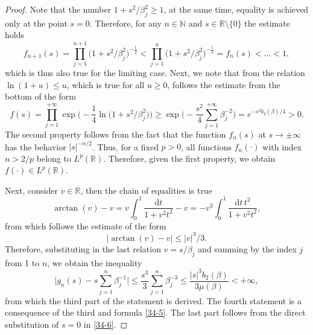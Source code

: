 \documentclass[a4paper]{article}
\begin{document}
\begin{proof} Note that the number $1+s^2/\beta_j^2\geqslant1$, at the same time, equality is achieved only at the point $s=0$. Therefore, for any $n\in\mathbb{N}$ and $s\in\mathbb{R}\setminus\{0\}$ the estimate holds
\begin{equation}\label{34-11}
f_{n+1}(s)=\prod_{j=1}^{n+1}\Big(1+s^2/\beta_j^2\Big)^{-\frac{1}{4}}<
\prod_{j=1}^{n}\Big(1+s^2/\beta_j^2\Big)^{-\frac{1}{4}}=f_{n}(s)<\ldots<1,
\end{equation}	
which is thus also true for the limiting case.
Next, we note that from the relation $\ln(1+u)\leqslant u$, which is true for all $u\geqslant0$, follows the estimate from the bottom of the form
\begin{equation}\label{34-12}
f(s)=\prod_{j=1}^{+\infty}\exp\bigg(-\frac{1}{4}\ln\big(1+s^2/\beta_j^2\big)\bigg)\geqslant
\exp\bigg(-\frac{s^2}{4}\sum_{j=1}^{+\infty}\beta_j^{-2}\bigg)=e^{-s^2b_2(\beta)/4}>0.
\end{equation}
The second property follows from the fact that the function $f_n(s)$ at $s\to\pm\infty$ has the behavior $|s|^{-n/2}$. Thus, for a fixed $p>0$, all functions $f_n(\cdot)$ with index $n>2/p$ belong to $L^p(\mathbb{R})$. Therefore, given the first property, we obtain $f(\cdot)\in L^p(\mathbb{R})$.

Next, consider $v\in\mathbb{R}$, then the chain of equalities is true
\begin{equation}\label{34-8}
\arctan(v)-v=v\int_0^1\frac{\mathrm{d}t}{1+v^2t^2}-v=-v^3\int_0^1\frac{\mathrm{d}t\,t^2}{1+v^2t^2},
\end{equation}
from which follows the estimate of the form
\begin{equation}\label{34-9}
\Big|\arctan(v)-v\Big|\leqslant|v|^3/3.
\end{equation}
Therefore, substituting in the last relation $v=s/\beta_j$ and summing by the index $j$ from 1 to $n$, we obtain the inequality
\begin{equation}\label{34-10}
\bigg|g_n(s)-s\sum_{j=1}^n\beta_j^{-1}\bigg|\leqslant\frac{s^3}{3}\sum_{j=1}^n\beta_j^{-3}
\leqslant\frac{|s|^3b_2(\beta)}{3\mu(\beta)}<+\infty,
\end{equation}
from which the third part of the statement is derived. The fourth statement is a consequence of the third and formula \eqref{34-5}. The last part follows from the direct substitution of $s=0$ in \eqref{34-6}.
\end{proof}
\end{document}
